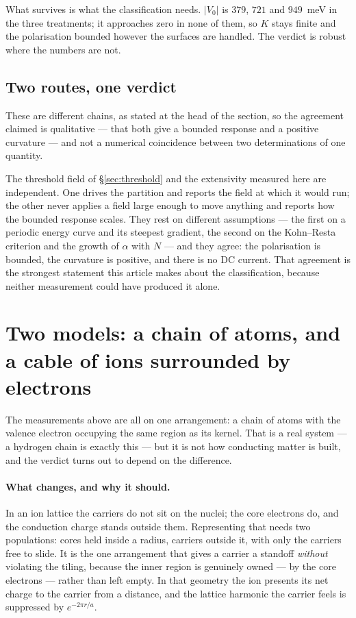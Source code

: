 \documentclass[11pt]{article}
\begin{document}
What survives is what the classification needs. $|V_0|$ is $379$, $721$ and $949$~meV in the three
treatments; it approaches zero in none of them, so $K$ stays finite and the polarisation bounded
however the surfaces are handled. The verdict is robust where the numbers are not.

\subsection{Two routes, one verdict}

These are different chains, as stated at the head of the section, so the agreement claimed is
qualitative --- that both give a bounded response and a positive curvature --- and not a numerical
coincidence between two determinations of one quantity.

The threshold field of \S\ref{sec:threshold} and the extensivity measured here are independent. One
drives the partition and reports the field at which it would run; the other never applies a field
large enough to move anything and reports how the bounded response scales. They rest on different
assumptions --- the first on a periodic energy curve and its steepest gradient, the second on the
Kohn--Resta criterion and the growth of $\alpha$ with $N$ --- and they agree: the polarisation is
bounded, the curvature is positive, and there is no DC current. That agreement is the strongest
statement this article makes about the classification, because neither measurement could have
produced it alone.


\section{Two models: a chain of atoms, and a cable of ions surrounded by electrons}\label{sec:three}

The measurements above are all on one arrangement: a chain of atoms with the valence electron
occupying the same region as its kernel. That is a real system --- a hydrogen chain is exactly
this --- but it is not how conducting matter is built, and the verdict turns out to depend on the
difference.

\paragraph{What changes, and why it should.} In an ion lattice the carriers do not sit on the
nuclei; the core electrons do, and the conduction charge stands outside them. Representing that needs
two populations: cores held inside a radius, carriers outside it, with only the carriers free to
slide. It is the one arrangement that gives a carrier a standoff \emph{without} violating the tiling,
because the inner region is genuinely owned --- by the core electrons --- rather than left empty. In
that geometry the ion presents its net charge to the carrier from a distance, and the lattice
harmonic the carrier feels is suppressed by $e^{-2\pi r/a}$.
\end{document}
